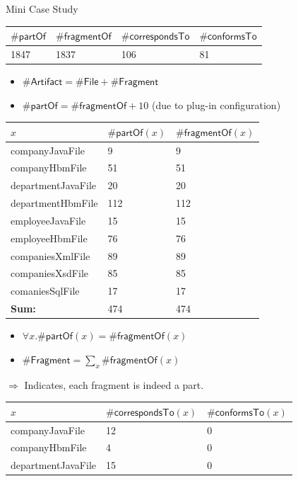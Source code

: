 \documentclass{beamer}
\newcommand{\Artifact}{\textsf{Artifact}}
\newcommand{\File}{\textsf{File}}
\newcommand{\Fragment}{\textsf{Fragment}}
\newcommand{\partOf}{\textsf{partOf}}
\newcommand{\fragmentOf}{\textsf{fragmentOf}}
\newcommand{\correspondsTo}{\textsf{correspondsTo}}
\newcommand{\conformsTo}{\textsf{conformsTo}}
\newcommand{\megalxtext}{\text{MegaL/Xtext}}
\begin{document}
\begin{frame}{Mini Case Study}
\begin{center}
\begin{tabular}{|l|l|l|l|}
\hline
$\#\partOf$ & $\#\fragmentOf$ & $\#\correspondsTo$ & $\#\conformsTo$
\\ \hline
1847 & 1837 & 106 & 81 
\\ \hline
\end{tabular}
\end{center}
\begin{itemize}
\item
$\#\Artifact = \#\File + \#\Fragment$
\item
$\#\partOf = \#\fragmentOf + 10$ (due to \megalxtext plug-in configuration)
\end{itemize}
\pagebreak
\begin{center}
\tiny
\begin{tabular}{|l|l|l|}
\hline
$x$ & $\#\partOf(x)$ & $\#\fragmentOf(x)$
\\ \hline
companyJavaFile & 9 & 9 
\\ \hline
companyHbmFile & 51 & 51 
\\ \hline
departmentJavaFile & 20 & 20 
\\ \hline
departmentHbmFile & 112 & 112 
\\ \hline
employeeJavaFile & 15 & 15 
\\ \hline
employeeHbmFile & 76 & 76 
\\ \hline
companiesXmlFile & 89 & 89 
\\ \hline
companiesXsdFile & 85 & 85 
\\ \hline
comaniesSqlFile & 17 & 17 
\\ \hline \hline
\textbf{Sum:} & 474 & 474 
\\ \hline 
\end{tabular}
\end{center}
\begin{itemize}
\item
$\forall x. \#\partOf(x) = \#\fragmentOf(x)$
\item
$\#\Fragment = \sum\limits_{x} \#\fragmentOf(x)$
\end{itemize}
$\Rightarrow$
Indicates, each fragment is indeed a part.
\pagebreak
\begin{center}
\tiny
\begin{tabular}{|l|l|l|}
\hline
$x$ & $\#\correspondsTo(x)$ & $\#\conformsTo(x)$
\\ \hline
companyJavaFile & 12 & 0 
\\ \hline
companyHbmFile & 4 & 0 
\\ \hline
departmentJavaFile & 15 & 0 
\\ \hline

\end{tabular}
\end{center}
\end{frame}
\end{document}
